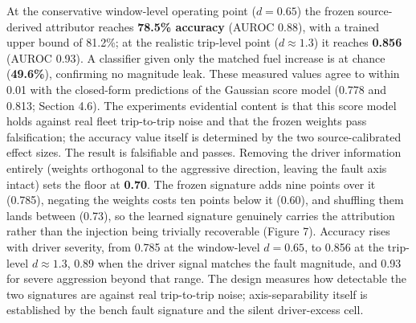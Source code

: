 At the conservative window-level operating point (\(d = 0.65\)) the
frozen source-derived attributor reaches \textbf{78.5\% accuracy} (AUROC
0.88), with a trained upper bound of 81.2\%; at the realistic trip-level
point (\(d \approx 1.3\)) it reaches \textbf{0.856} (AUROC 0.93). A
classifier given only the matched fuel increase is at chance
(\textbf{49.6\%}), confirming no magnitude leak. These measured values
agree to within 0.01 with the closed-form predictions of the Gaussian
score model (0.778 and 0.813; Section 4.6). The
experiment\textquotesingle s evidential content is that this score model
holds against real fleet trip-to-trip noise and that the frozen weights
pass falsification; the accuracy value itself is determined by the two
source-calibrated effect sizes. The result is falsifiable and passes.
Removing the driver information entirely (weights orthogonal to the
aggressive direction, leaving the fault axis intact) sets the floor at
\textbf{0.70}. The frozen signature adds nine points over it (0.785),
negating the weights costs ten points below it (0.60), and shuffling
them lands between (0.73), so the learned signature genuinely carries
the attribution rather than the injection being trivially recoverable
(Figure 7). Accuracy rises with driver severity, from 0.785 at the
window-level \(d = 0.65\), to 0.856 at the trip-level \(d \approx 1.3\),
0.89 when the driver signal matches the fault magnitude, and 0.93 for
severe aggression beyond that range. The design measures how detectable
the two signatures are against real trip-to-trip noise;
axis-separability itself is established by the bench fault signature and
the silent driver-excess cell.

